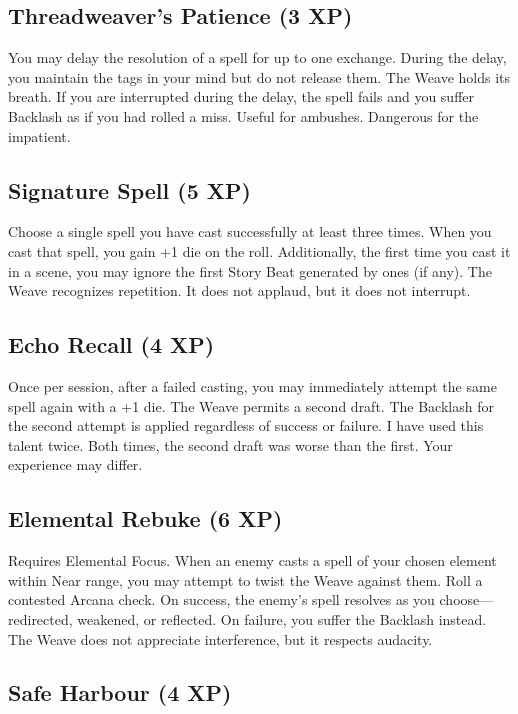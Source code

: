 \subsection{Threadweaver's Patience (3 XP)}

You may delay the resolution of a spell for up to one exchange. During the delay, you maintain the tags in your mind but do not release them. The Weave holds its breath. If you are interrupted during the delay, the spell fails and you suffer Backlash as if you had rolled a miss. Useful for ambushes. Dangerous for the impatient.

\subsection{Signature Spell (5 XP)}

Choose a single spell you have cast successfully at least three times. When you cast that spell, you gain +1 die on the roll. Additionally, the first time you cast it in a scene, you may ignore the first Story Beat generated by ones (if any). The Weave recognizes repetition. It does not applaud, but it does not interrupt.

\subsection{Echo Recall (4 XP)}

Once per session, after a failed casting, you may immediately attempt the same spell again with a +1 die. The Weave permits a second draft. The Backlash for the second attempt is applied regardless of success or failure. I have used this talent twice. Both times, the second draft was worse than the first. Your experience may differ.

\subsection{Elemental Rebuke (6 XP)}

Requires Elemental Focus. When an enemy casts a spell of your chosen element within Near range, you may attempt to twist the Weave against them. Roll a contested Arcana check. On success, the enemy's spell resolves as you choose---redirected, weakened, or reflected. On failure, you suffer the Backlash instead. The Weave does not appreciate interference, but it respects audacity.

\subsection{Safe Harbour (4 XP)}

